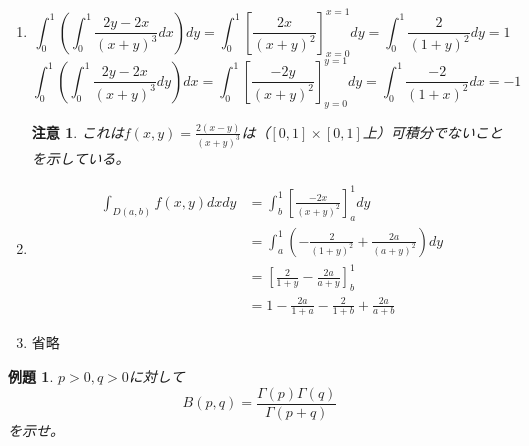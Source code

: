 \documentclass[dvipdfmx,a4j,10pt]{jsarticle}
\makeatletter
\theoremstyle{mystyle1}
\newtheorem{exs}[dfn]{例題}
\theoremstyle{mystyle2}
\newtheorem{ans}{解答}
\newtheorem{note}{注意}
\renewenvironment{ans}[1][解答]{\par
  \pushQED{\qed}%
  \normalfont
  \topsep6\p@\@plus6\p@ \trivlist
  \item[\hskip\labelsep{\bfseries\sffamily #1}]\ignorespaces
}{%
  \popQED\endtrivlist\@endpefalse
}
\makeatother
\begin{document}
\begin{ans}
    \begin{enumerate}\renewcommand{\labelenumi}{(\arabic{enumi})}
    \item
    \[
        \int_0^1\left(\int_0^1\frac{2y-2x}{(x+y)^3}dx\right)dy=\int_0^1\left[\frac{2x}{(x+y)^2}\right]_{x=0}^{x=1}dy=\int_0^1\frac{2}{(1+y)^2}dy=1
    \]
    \[
        \int_0^1\left(\int_0^1\frac{2y-2x}{(x+y)^3}dy\right)dx=\int_0^1\left[\frac{-2y}{(x+y)^2}\right]_{y=0}^{y=1}dy=\int_0^1\frac{-2}{(1+x)^2}dx=-1
    \]
    \begin{note}
        これは$\displaystyle f(x,y)=\frac{2(x-y)}{(x+y)^3}$は（$[0,1]\times[0,1]$上）可積分でないことを示している。
    \end{note}
    \item
	\[
	\begin{split}
		\int_{D(a,b)}f(x,y)dxdy
		&=\int_b^1\left[\frac{-2x}{(x+y)^2}\right]_a^1 dy\\
		&=\int_a^1\left(-\frac{2}{(1+y)^2}+\frac{2a}{(a+y)^2}\right)dy\\
		&=\left[\frac{2}{1+y}-\frac{2a}{a+y}\right]_b^1\\
		&=1-\frac{2a}{1+a}-\frac{2}{1+b}+\frac{2a}{a+b}
	\end{split}
	\]
    \item 省略
    \end{enumerate}
\end{ans}

\newpage

\begin{framed}
\begin{exs}
	$p>0,q>0$に対して
	\[
		B(p,q)=\frac{\Gamma(p)\Gamma(q)}{\Gamma(p+q)}
	\]
	を示せ。\footnotemark
\end{exs}
\end{framed}

\end{document}

